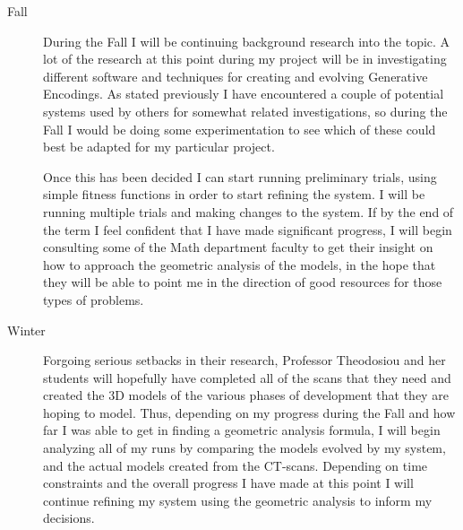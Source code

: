 \documentclass[condensed]{union-cs-thesis}
\begin{document}
\begin{description}
\item[Fall] During the Fall I will be continuing background research into the topic.  A lot of the
  research at this point during my project will be in investigating different software and
  techniques for creating and evolving Generative Encodings.  As stated previously I have encountered
  a couple of potential systems used by others for somewhat related investigations, so during the
  Fall I would be doing some experimentation to see which of these could best be adapted for my
  particular project.
  \par
  Once this has been decided I can start running preliminary trials, using simple fitness functions
  in order to start refining the system.  I will be running multiple trials and making changes to the
  system.  If by the end of the term I feel confident that I have made significant progress, I will
  begin consulting some of the Math department faculty to get their insight on how to approach the
  geometric analysis of the models, in the hope that they will be able to point me in the direction
  of good resources for those types of problems.
\item[Winter] Forgoing serious setbacks in their research, Professor Theodosiou and her students
  will hopefully have completed all of the scans that they need and created the 3D models of the
  various phases of development that they are hoping to model.  Thus, depending on my progress during
  the Fall and how far I was able to get in finding a geometric analysis formula, I will begin
  analyzing all of my runs by comparing the models evolved by my system, and the actual models created
  from the CT-scans.  Depending on time constraints and the overall progress I have made at this point
  I will continue refining my system using the geometric analysis to inform my decisions.
\end{description}




\end{document}
